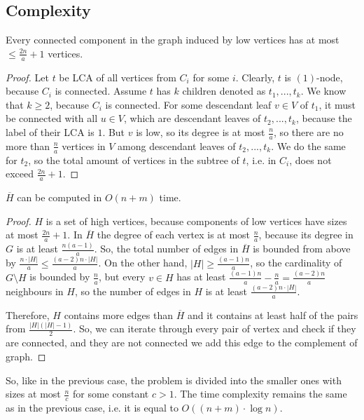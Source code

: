\subsection{Complexity}
\begin{theorem}
    Every connected component in the graph induced by low vertices has at most $\leq \frac{2n}{a} + 1$ vertices.
\end{theorem}
\begin{proof}
    Let $t$ be LCA of all vertices from $C_i$ for some $i$. Clearly, $t$ is $(1)$-node, because $C_i$ is connected. Assume $t$ has $k$ children denoted as $t_1,..., t_k$. We know that $k \geq 2$, because $C_i$ is connected. For some descendant leaf $v \in V$ of $t_1$, it must be connected with all $u \in V$, which are descendant leaves of $t_2,..., t_k$, because the label of their LCA is $1$. But $v$ is low, so its degree is at most $\frac{n}{a}$, so there are no more than $\frac{n}{a}$ vertices in $V$ among descendant leaves of $t_2, ..., t_k$. We do the same for $t_2$, so the total amount of vertices in the subtree of $t$, i.e. in $C_i$, does not exceed $\frac{2n}{a} + 1$.
\end{proof}

\begin{theorem}
    $\overline{H}$ can be computed in $O(n+m)$ time.
\end{theorem}
\begin{proof}
$H$ is a set of high vertices, because components of low vertices have sizes at most $\frac{2n}{a} + 1$.
    In $\overline{H}$ the degree of each vertex is at most $\frac{n}{a}$, because its degree in $G$ is at least $\frac{n(a-1)}{a}$. So, the total number of edges in $\overline{H}$ is bounded from above by $ \frac{n \cdot |H|}{a} \leq \frac{(a-2)n \cdot |H|}{a}$. On the other hand, $|H| \geq \frac{(a-1)n}{a}$, so the cardinality of $G \setminus H$ is bounded by $ \frac{n}{a}$, but every $v \in H$ has at least $\frac{(a-1)n}{a} - \frac{n}{a} = \frac{(a-2)n}{a}$ neighbours in $H$, so the number of edges in $H$ is at least $\frac{(a-2)n \cdot |H|}{a}$.

    
    Therefore, $H$ contains more edges than $\overline{H}$ and it contains at least half of the pairs from $\frac{|H|(|H|-1)}{2}$. So, we can iterate through every pair of vertex and check if they are connected, and they are not connected we add this edge to the complement of graph.
\end{proof}
So, like in the previous case, the problem is divided into the smaller ones with sizes at most $\frac{n}{c}$ for some constant $c > 1$. The time complexity remains the same as in the previous case, i.e. it is equal to $O((n+m) \cdot \log{n})$.